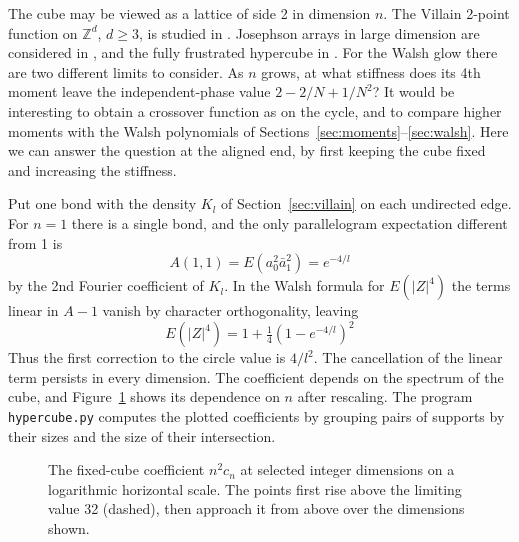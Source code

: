 \documentclass[11pt,a4paper]{article}
\theoremstyle{remark}
\begin{document}
The cube may be viewed as a lattice of side 2 in dimension $n$. The Villain 2-point function on $\mathbb Z^d$, $d\ge3$, is studied in \cite{dariowu}. Josephson arrays in large dimension are considered in \cite{par}, and the fully frustrated hypercube in \cite{mp3}. For the Walsh glow there are two different limits to consider. As $n$ grows, at what stiffness does its 4th moment leave the independent-phase value $2-2/N+1/N^2$? It would be interesting to obtain a crossover function as on the cycle, and to compare higher moments with the Walsh polynomials of Sections~\ref{sec:moments}--\ref{sec:walsh}. Here we can answer the question at the aligned end, by first keeping the cube fixed and increasing the stiffness.

Put one bond with the density $K_l$ of Section~\ref{sec:villain} on each undirected edge. For $n=1$ there is a single bond, and the only parallelogram expectation different from 1 is
\[
 A(1,1)=E(a_0^2\bar a_1^2)=e^{-4/l}
\]
by the 2nd Fourier coefficient of $K_l$. In the Walsh formula for $E(|Z|^4)$ the terms linear in $A-1$ vanish by character orthogonality, leaving
\[
 E(|Z|^4)=1+\tfrac14(1-e^{-4/l})^2
\]
Thus the first correction to the circle value is $4/l^2$. The cancellation of the linear term persists in every dimension. The coefficient depends on the spectrum of the cube, and Figure~\ref{fig:cube-coeff} shows its dependence on $n$ after rescaling. The program \texttt{hypercube.py} computes the plotted coefficients by grouping pairs of supports by their sizes and the size of their intersection.

\begin{figure}[H]
\centering
{}
\caption{The fixed-cube coefficient $n^2c_n$ at selected integer dimensions on a logarithmic horizontal scale. The points first rise above the limiting value 32 (dashed), then approach it from above over the dimensions shown.}\label{fig:cube-coeff}
\end{figure}
\end{document}
